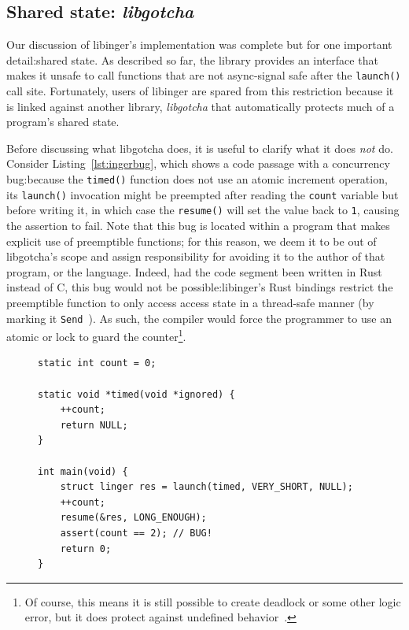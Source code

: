 \subsection{Shared state: \textit{libgotcha}}
\label{sec:libgotcha}

Our discussion of libinger's implementation was complete but for one important
detail:\@ shared state.  As described so far, the library provides an interface that
makes it unsafe to call functions that are not async-signal safe after the
\texttt{launch()} call site.  Fortunately, users of libinger are spared from this
restriction because it is linked against another library, \textit{libgotcha} that
automatically protects much of a program's shared state.

Before discussing what libgotcha does, it is useful to clarify what it does
\textit{not} do.  Consider Listing~\ref{lst:ingerbug}, which shows
a code passage with a concurrency bug:\@ because the \texttt{timed()} function does
not use an atomic increment operation, its \texttt{launch()} invocation might be
preempted after reading the \texttt{count} variable but before writing it, in which
case the \texttt{resume()} will set the value back to \texttt{1}, causing
the assertion to fail.  Note that this bug is located within a program that makes
explicit use of preemptible functions; for this reason, we deem it to be out of
libgotcha's scope and assign responsibility for avoiding it to the author of that
program, or the language.  Indeed, had the code segment been written in Rust instead
of C, this bug would not be possible:\@ libinger's Rust bindings restrict the
preemptible function to only access access state in a thread-safe manner
(by marking it \texttt{Send}~\cite{www-rustlang-conc}).  As such, the compiler would
force the programmer to use an atomic or lock to guard the counter\footnote{Of
course, this means it is still possible to create deadlock or some other logic error,
but it does protect against undefined behavior~\cite{www-rustlang-nu}.}.

\begin{figure}
\begin{lstlisting}[label=lst:ingerbug,caption=Concurrency bug in internal stateful code]
static int count = 0;

static void *timed(void *ignored) {
	++count;
	return NULL;
}

int main(void) {
	struct linger res = launch(timed, VERY_SHORT, NULL);
	++count;
	resume(&res, LONG_ENOUGH);
	assert(count == 2); // BUG!
	return 0;
}
\end{lstlisting}
\end{figure}

